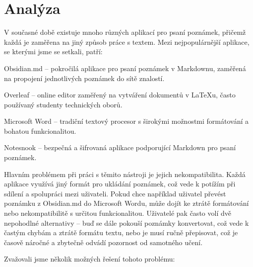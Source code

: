 \section{Analýza}

V současné době existuje mnoho různých aplikací pro psaní poznámek, přičemž každá je zaměřena na jiný způsob práce s textem. Mezi nejpopulárnější aplikace, se kterými jsme se setkali, patří:

Obsidian.md -- pokročilá aplikace pro psaní poznámek v Markdownu, zaměřená na propojení jednotlivých poznámek do sítě znalostí.

Overleaf -- online editor zaměřený na vytváření dokumentů v LaTeXu, často používaný studenty technických oborů.

Microsoft Word -- tradiční textový procesor s širokými možnostmi formátování a bohatou funkcionalitou.

Notesnook -- bezpečná a šifrovaná aplikace podporující Markdown pro psaní poznámek.

Hlavním problémem při práci s těmito nástroji je jejich nekompatibilita. Každá aplikace využívá jiný formát pro ukládání poznámek, což vede k potížím při sdílení a spolupráci mezi uživateli. Pokud chce například uživatel převést poznámku z Obsidian.md do Microsoft Wordu, může dojít ke ztrátě formátování nebo nekompatibilitě s určitou funkcionalitou. Uživatelé pak často volí dvě nepohodlné alternativy -- buď se dále pokouší poznámky konvertovat, což vede k častým chybám a ztrátě formátu textu, nebo je musí ručně přepisovat, což je časově náročné a zbytečně odvádí pozornost od samotného učení.

Zvažovali jsme několik možných řešení tohoto problému:

